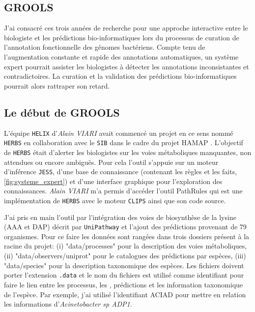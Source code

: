 \begin{refsegment}
\chapter{GROOLS}

J'ai consacré ces trois années de recherche pour une approche interactive entre le biologiste et les prédictions bio-informatiques lors du processus de curation de l'annotation fonctionnelle des génomes bactériens. Compte tenu de l'augmentation constante et rapide des annotations automatiques, un système expert pourrait assister les biologistes à détecter les annotations inconsistantes et contradictoires. La curation et la validation des prédictions bio-informatiques pourrait alors rattraper son retard.

\section{Le début de GROOLS}

L'équipe \texttt{HELIX} d'\textit{Alain VIARI} avait commencé un projet en ce sens nommé \texttt{\gls{HERBS}} en collaboration avec le \texttt{\gls{SIB}} dans le cadre du projet \gls{HAMAP} \cite{pedruzzi2015hamap}. L'objectif de \texttt{\gls{HERBS}} était d'alerter les biologistes sur les voies métaboliques manquantes, non attendues ou encore ambiguës. Pour cela l'outil s'appuie sur un moteur d'inférence \texttt{\gls{JESS}}, d'une base de connaissance (contenant les règles et les faits, \cref{fig:systeme_expert}) et d'une interface graphique pour l'exploration des connaissances. \textit{Alain VIARI} m'a permis d'accéder l'outil PathRules qui est une implémentation de \texttt{\gls{HERBS}} avec le moteur \texttt{\gls{CLIPS}} \cite{riley1991clips} ainsi que son code source.


J'ai pris en main l'outil par l'intégration des voies de biosynthèse de la lysine (AAA et DAP) décrit par \texttt{UniPathway} et l'ajout des prédictions provenant de 79 organismes. Pour ce faire les données sont rangées dans trois dossiers présent à la racine du projet: (i) "data/processes" pour la description des voies métaboliques, (ii) "data/observers/uniprot" pour le catalogues des prédictions par espèces, (iii) "data/species" pour la description taxonomique des espèces. Les fichiers doivent porter l'extension \texttt{.data} et le nom du fichiers est utilisé comme identifiant pour faire le lien entre les processus, les , prédictions et les information taxonomique de l'espèce. Par exemple, j'ai utilisé l'identifiant ACIAD pour mettre en relation les informations d'\textit{Acinetobacter sp ADP1}.


\end{refsegment}
